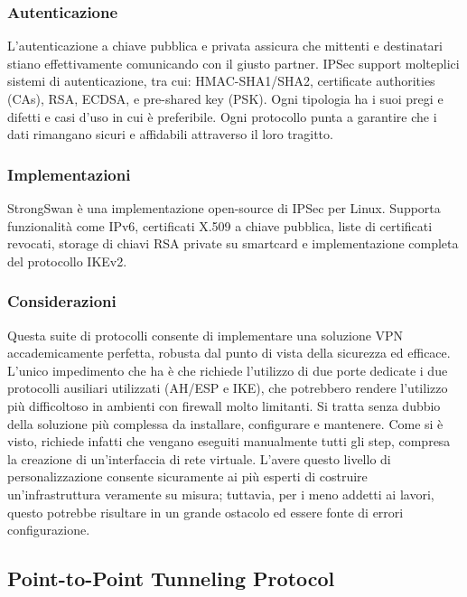 \subsubsection{Autenticazione}
L'autenticazione a chiave pubblica e privata assicura che mittenti e destinatari stiano effettivamente comunicando con il giusto partner. IPSec support molteplici sistemi di autenticazione, tra cui: HMAC-SHA1/SHA2, certificate authorities (CAs), RSA, ECDSA, e pre-shared key (PSK). Ogni tipologia ha i suoi pregi e difetti e casi d'uso in cui è preferibile. Ogni protocollo punta a garantire che i dati rimangano sicuri e affidabili attraverso il loro tragitto.

\subsubsection{Implementazioni}
StrongSwan è una implementazione open-source di IPSec per Linux. Supporta funzionalità come IPv6, certificati X.509 a chiave pubblica, liste di certificati revocati, storage di chiavi RSA private su smartcard e implementazione completa del protocollo IKEv2.

\subsubsection{Considerazioni}
Questa suite di protocolli consente di implementare una soluzione VPN accademicamente perfetta, robusta dal punto di vista della sicurezza ed efficace. L'unico impedimento che ha è che richiede l'utilizzo di due porte dedicate i due protocolli ausiliari utilizzati (AH/ESP e IKE), che potrebbero rendere l'utilizzo più difficoltoso in ambienti con firewall molto limitanti.
Si tratta senza dubbio della soluzione più complessa da installare, configurare e mantenere. Come si è visto, richiede infatti che vengano eseguiti manualmente tutti gli step, compresa la creazione di un'interfaccia di rete virtuale.
L'avere questo livello di personalizzazione consente sicuramente ai più esperti di costruire un'infrastruttura veramente su misura; tuttavia, per i meno addetti ai lavori, questo potrebbe risultare in un grande ostacolo ed essere fonte di errori configurazione.

\subsection{Point-to-Point Tunneling Protocol}
